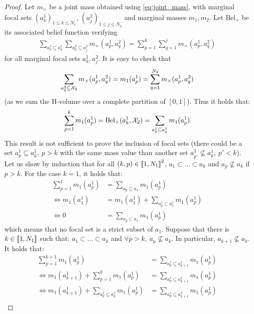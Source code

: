 \begin{proof}
    Let $m_\times$ be a joint mass obtained using \eqref{eq:joint_mass}, with marginal focal sets $(a^1_k)_{1\leqslant k\leqslant N_1}$, $(a^2_j)_{1\leqslant j\leqslant N_2}$ and marginal masses $m_1,m_2$. 
    Let $\mathrm{Bel}_\times$ be its associated belief function verifying
    \begin{align*}
        \sum_{a^1_p\subseteq a^1_k}\sum_{a^2_q\subseteq a_j^2}m_\times(a^1_p, a^2_q) = \sum_{p=1}^k\sum_{q=1}^j m_\times(a^1_p, a^2_q)
    \end{align*}
    for all marginal focal sets $a^1_k,a^2_j$. It is easy to check that
    \begin{align*}
        \sum_{a^2_q\subseteq {\mathcal{X}}_2}m_\times(a^1_p, a^2_q)=m_1(a^1_p)=\sum_{q=1}^{N_2}m_\times(a^1_p, a^2_q)    
    \end{align*}
    (as we sum the H-volume over a complete partition of $[0,1]$). Thus it holds that:
    \begin{align*}
        \sum_{p=1}^k m_1(a^1_p) = \mathrm{Bel}_\times(a^1_k,{\mathcal{X}}_2)=\sum_{a^1_p\subseteq a_k^1}m_1(a^1_p)
    \end{align*}
    This result is not sufficient to prove the inclusion of focal sets (there could be a set $a^1_p\subseteq a^1_k,~p>k$ with the same mass value than another set $a^1_{p'}\not\subseteq a^1_k,~p' < k$). Let us show by induction that for all $(k, p)\in{[\![}1,N_1{]\!]}^2$, $a_1\subset\dots\subset a_k$ and $a_p\not\subseteq a_k$ if $p>k$.
    For the case $k=1$, it holds that:
    \begin{align*}
        \sum_{p=1}^1m_1(a^1_p) &= \sum_{a_p\subseteq a_1}m_1(a^1_p)\\
        \Leftrightarrow m_1(a^1_1) &= m_1(a^1_1) + \sum_{a^1_p\subset a^1_1}m_1(a^1_p)\\
        \Leftrightarrow 0 &=\sum_{a_p\subset a_1}m_1(a^1_p)
    \end{align*}
    which means that no focal set is a strict subset of $a_1$.
    Suppose that there is $k\in{[\![}1,N_1{]\!]}$ such that: $a_1\subset\dots\subset a_k$ and $\forall p>k,~a_p\not\subseteq a_k$. In particular, $a_{k+1}\not\subseteq a_k$. It holds that:
    \begin{align*}
        \sum_{p=1}^{k+1}m_1(a^1_p) &= \sum_{a^1_p\subseteq a^1_{k+1}}m_1(a^1_p)\\
        \Leftrightarrow m_1(a^1_{k+1}) + \sum_{p=1}^{k} m_1(a^1_p) &= \sum_{a^1_p\subseteq a^1_{k+1}}m_1(a^1_p)\\
        \Leftrightarrow m_1(a^1_{k+1}) + \sum_{a^1_p\subseteq a^1_k} m_1(a^1_p) &= \sum_{a^1_p\subseteq a^1_{k+1}}m_1(a^1_p)\\

\end{align*}
\end{proof}
